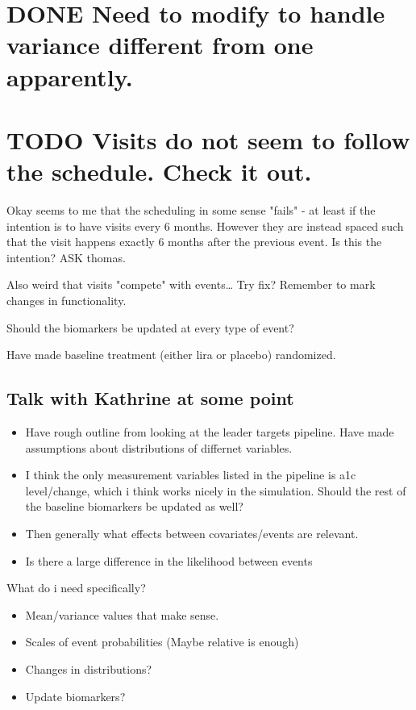 \documentclass[11pt]{article}
\begin{document}
\section{{\bfseries\sffamily DONE} Need to modify to handle variance different from one apparently.}
\label{sec:org5b6b2e9}
\section{{\bfseries\sffamily TODO} Visits do not seem to follow the schedule. Check it out.}
\label{sec:orgf234d6a}
Okay seems to me that the scheduling in some sense "fails" - at least
if the intention is to have visits every 6 months. However they are
instead spaced such that the visit happens exactly 6 months after the
previous event. Is this the intention? ASK thomas.

Also weird that visits "compete" with events\ldots{}
Try fix? Remember to mark changes in functionality.

Should the biomarkers be updated at every type of event?

Have made baseline treatment (either lira or placebo) randomized.
\subsection{Talk with Kathrine at some point}
\label{sec:org688313b}
\begin{itemize}
\item Have rough outline from looking at the leader targets pipeline.
Have made assumptions about distributions of differnet variables.

\item I think the only measurement variables listed in the pipeline
is a1c level/change, which i think works nicely in the simulation.
Should the rest of the baseline biomarkers be updated as well?

\item Then generally what effects between covariates/events are relevant.

\item Is there a large difference in the likelihood between events
\end{itemize}

What do i need specifically?
\begin{itemize}
\item Mean/variance values that make sense.
\item Scales of event probabilities (Maybe relative is enough)
\item Changes in distributions?
\item Update biomarkers?
\end{itemize}
\end{document}
